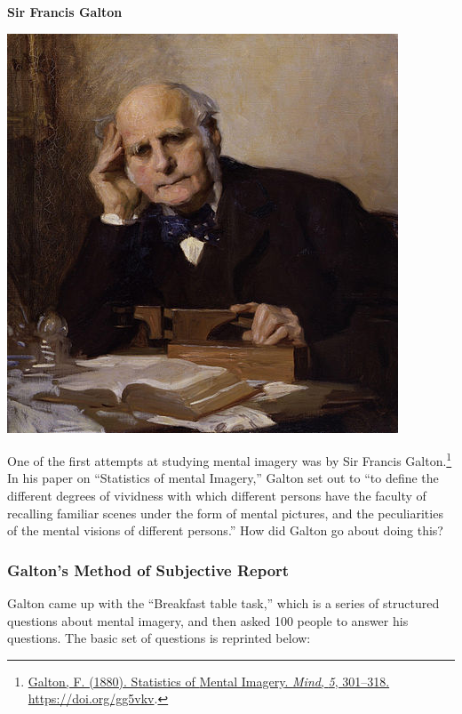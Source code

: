 \documentclass[
  oneside,
  12pt]{crumpbook}
\newenvironment{floatrightbox25}{%
  \wrapfigure{R}{.25\textwidth}%
  }{%
  \endwrapfigure}
\begin{document}
\begin{floatrightbox25}
\textbf{Sir Francis Galton}

\includegraphics[width=1\linewidth]{imgs/Francis_Galton}

\end{floatrightbox25}

One of the first attempts at studying mental imagery was by Sir Francis Galton.\footnote{\protect\hyperlink{ref-galtonStatisticsMentalImagery1880}{Galton, F. (1880). Statistics of {Mental Imagery}. \emph{Mind}, \emph{5}, 301--318. \url{https://doi.org/gg5vkv}}.} In his paper on ``Statistics of mental Imagery,'' Galton set out to ``to define the different degrees of vividness with which different persons have the faculty of recalling familiar scenes under the form of mental pictures, and the peculiarities of the mental visions of different persons.'' How did Galton go about doing this?

\hypertarget{galtons-method-of-subjective-report}{%
\subsubsection{Galton's Method of Subjective Report}\label{galtons-method-of-subjective-report}}

Galton came up with the ``Breakfast table task,'' which is a series of structured questions about mental imagery, and then asked 100 people to answer his questions. The basic set of questions is reprinted below:
\end{document}
